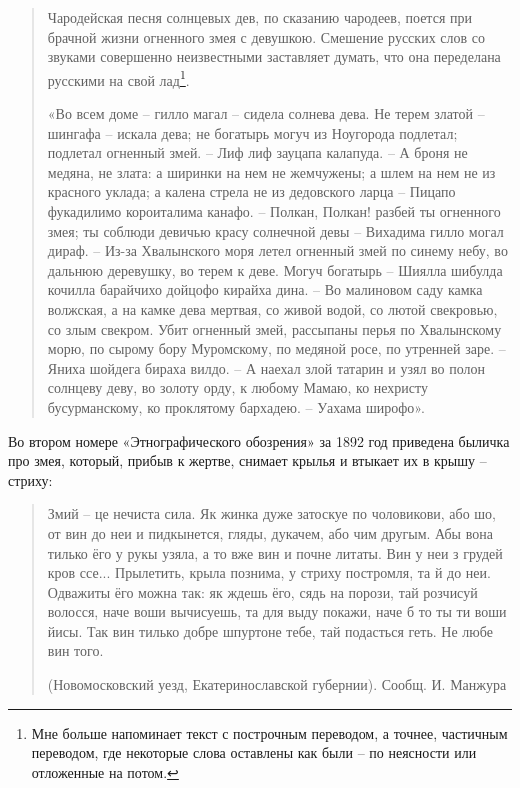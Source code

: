 \begin{quotation}
Чародейская песня солнцевых дев, по сказанию чародеев, поется при брачной жизни огненного змея с девушкою. Смешение русских слов со звуками совершенно неизвестными заставляет думать, что она переделана русскими на свой лад\footnote{Мне больше напоминает текст с построчным переводом, а точнее, частичным переводом, где некоторые слова оставлены как были – по неясности или отложенные на потом.}.

«Во всем доме – гилло магал – сидела солнева дева. Не терем златой – шингафа – искала дева; не богатырь могуч из Ноугорода подлетал; подлетал огненный змей. – Лиф лиф зауцапа калапуда. – А броня не медяна, не злата: а ширинки на нем не жемчужены; а шлем на нем не из красного уклада; а калена стрела не из дедовского ларца – Пицапо фукадилимо короиталима канафо. – Полкан, Полкан! разбей ты огненного змея; ты соблюди девичью красу солнечной девы – Вихадима гилло могал дираф. – Из-за Хвалынского моря летел огненный змей по синему небу, во дальнюю деревушку, во терем к деве. Могуч богатырь – Шиялла шибулда кочилла барайчихо дойцофо кирайха дина. – Во малиновом саду камка волжская, а на камке дева мертвая, со живой водой, со лютой свекровью, со злым свекром. Убит огненный змей, рассыпаны перья по Хвалынскому морю, по сырому бору Муромскому, по медяной росе, по утренней заре. – Яниха шойдега бираха вилдо. – А наехал злой татарин и узял во полон солнцеву деву, во золоту орду, к любому Мамаю, ко нехристу бусурманскому, ко проклятому бархадею. – Уахама широфо».
\end{quotation}

Во втором номере «Этнографического обозрения» за 1892 год приведена быличка про змея, который, прибыв к жертве, снимает крылья и втыкает их в крышу – стриху:

\begin{quotation}
Змий – це нечиста сила. Як жинка дуже затоскуе по чоловикови, або шо, от вин до неи и пидкынется, гляды, дукачем, або чим другым. Абы вона тилько ёго у рукы узяла, а то вже вин и почне литаты. Вин у неи з грудей кров ссе... Прылетить, крыла познима, у стриху постромля, та й до неи. Одважиты ёго можна так: як ждешь ёго, сядь на порози, тай розчисуй волосся, наче воши вычисуешь, та для выду покажи, наче б то ты ти воши йисы. Так вин тилько добре шпуртоне тебе, тай подасться геть. Не любе вин того.

(Новомосковский уезд, Екатеринославской губернии). Сообщ. И. Манжура
\end{quotation}

